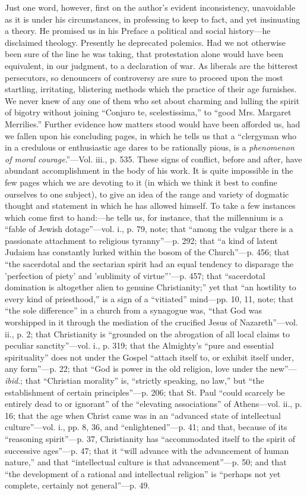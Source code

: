 Just one word, however, first on the author's
evident inconsistency, unavoidable as it is under his circumstances,
in professing to keep to fact, and yet insinuating a theory. He
promised us in his Preface a political and social history—he
disclaimed theology. Presently he deprecated polemics. Had we not
otherwise been sure of the line he was taking, that protestation alone
would have been equivalent, in our judgment, to a declaration of war.
As liberals are the bitterest persecutors, so denouncers of
controversy are sure to proceed upon the most startling, irritating,
blistering methods which the practice of their age furnishes. We never
knew of any one of them who set about charming and lulling the spirit
of bigotry without joining ``Conjuro te, scelestissima,'' to ``good Mrs.
Margaret Merrilies.'' Further evidence how matters stood would have
been afforded us, had we fallen upon his concluding pages, in which he
tells us that a ``clergyman who in a credulous or enthusiastic age
dares to be rationally pious, is a \emph{phenomenon of moral courage}.''—Vol.
iii., p. 535. These signs of conflict, before and after, have abundant
accomplishment in the body of his work. It is quite impossible in the
few pages which we are devoting to it (in which we think it best to
confine ourselves to one subject), to give an idea of the range and
variety of dogmatic thought and statement in which he has
allowed himself. To take a few instances which come first to
hand:—he tells us, for instance, that the millennium is a ``fable of
Jewish dotage''—vol. i., p. 79, note; that ``among the vulgar there is
a passionate attachment to religious tyranny''—p. 292; that ``a kind of
latent Judaism has constantly lurked within the bosom of the Church''—p.
456; that ``the sacerdotal and the sectarian spirit had an equal
tendency to disparage the 'perfection of piety' and 'sublimity of
virtue'''—p. 457; that ``sacerdotal domination is altogether alien to
genuine Christianity;'' yet that ``an hostility to every kind of
priesthood,'' is a sign of a ``vitiated'' mind—pp. 10, 11, note; that ``the
sole difference'' in a church from a synagogue was, ``that God was
worshipped in it through the mediation of the crucified Jesus of
Nazareth''—vol. ii., p. 2; that Christianity is ``grounded on the
abrogation of all local claims to peculiar sanctity''—vol. i., p.
319; that the Almighty's ``pure and essential spirituality'' does not
under the Gospel ``attach itself to, or exhibit itself under, any form''—p.
22; that ``God is power in the old religion, love under the new''—\emph{ibid}.;
that ``Christian morality'' is, ``strictly speaking, no law,'' but ``the
establishment of certain principles''—p. 206; that St. Paul ``could
scarcely be entirely dead to or ignorant'' of the ``elevating
associations'' of Athens—vol. ii., p. 16; that the age when Christ
came was in an ``advanced state of intellectual culture''—vol. i., pp.
8, 36, and ``enlightened''—p. 41; and that, because of its ``reasoning
spirit''—p. 37, Christianity has ``accommodated itself to the
spirit of successive ages''—p. 47; that it ``will advance with the
advancement of human nature,'' and that ``intellectual culture is that
advancement''—p. 50; and that ``the development of a rational
and intellectual religion'' is ``perhaps not yet complete, certainly not
general''—p. 49.

